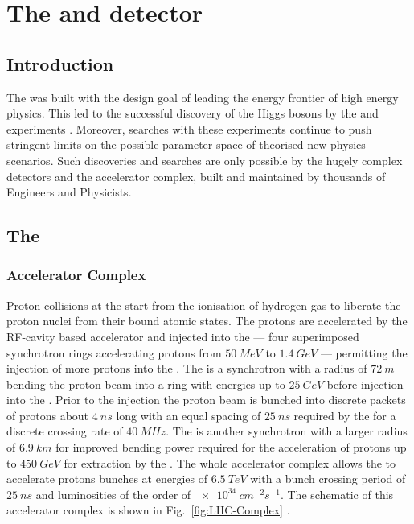 \chapter{The \LHC and \CMS detector}
\label{chap:detector}


\section{Introduction}

The \LHC was built with the design goal of leading the energy frontier of high
energy physics. This led to the successful discovery of the Higgs bosons by the
\ATLAS \cite{Aad:1471031} and \CMS experiments \cite{Chatrchyan:1471016}.
Moreover, \BSM searches with these experiments continue to push stringent
limits on the possible parameter-space of theorised new physics scenarios. Such
discoveries and searches are only possible by the hugely complex detectors
and the \LHC accelerator complex, built and maintained by thousands of Engineers
and Physicists.

\section{The \LHC}

\subsection{Accelerator Complex}

Proton collisions at the \LHC start from the ionisation of hydrogen gas to
liberate the proton nuclei from their bound atomic states. The protons are
accelerated by the RF-cavity based accelerator \LINACTWO and injected into the
\PSBooster --- four superimposed synchrotron rings accelerating protons from
${\SI{50}{MeV}}$ to ${\SI{1.4}{GeV}}$ --- permitting the injection of more
protons into the \PS. The \PS is a synchrotron with a radius of
${\SI{72}{m}}$ bending the proton beam into a ring with energies up to
${\SI{25}{GeV}}$ before injection into the \SPS. Prior to the injection the
proton beam is bunched into discrete packets of protons about ${\SI{4}{ns}}$
long with an equal spacing of ${\SI{25}{ns}}$ required by the \LHC for a
discrete crossing rate of ${\SI{40}{MHz}}$. The \SPS is another synchrotron
with a larger radius of ${\SI{6.9}{km}}$ for improved bending power required
for the acceleration of protons up to ${\SI{450}{GeV}}$ for extraction by the
\LHC. The whole accelerator complex allows the \LHC to accelerate protons
bunches at energies of ${\SI{6.5}{TeV}}$ with a bunch crossing period of
${\SI{25}{ns}}$ and luminosities of the order of ${\SI{e34}{cm^{-2}s^{-1}}}$.
The schematic of this accelerator complex is shown in Fig.~\ref{fig:LHC-Complex}
\cite{Benedikt:823808}.

